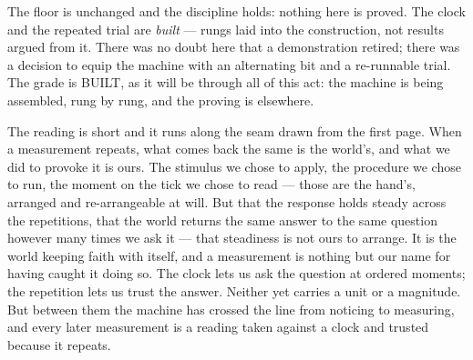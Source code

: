 The floor is unchanged and the discipline holds: nothing here is proved. The clock and the repeated trial are
\emph{built} --- rungs laid into the construction, not results argued from it. There was no doubt here that a
demonstration retired; there was a decision to equip the machine with an alternating bit and a re-runnable trial.
The grade is BUILT, as it will be through all of this act: the machine is being assembled, rung by rung, and the
proving is elsewhere.

The reading is short and it runs along the seam drawn from the first page. When a measurement
repeats, what comes back the same is the world's, and what we did to provoke it is ours. The stimulus we chose to
apply, the procedure we chose to run, the moment on the tick we chose to read --- those are the hand's, arranged
and re-arrangeable at will. But that the response holds steady across the repetitions, that the world returns the
same answer to the same question however many times we ask it --- that steadiness is not ours to arrange. It is
the world keeping faith with itself, and a measurement is nothing but our name for having caught it doing so. The
clock lets us ask the question at ordered moments; the repetition lets us trust the answer. Neither yet carries a
unit or a magnitude. But between them the machine has crossed the line from noticing to measuring, and every
later measurement is a reading taken against a clock and trusted because it repeats.
